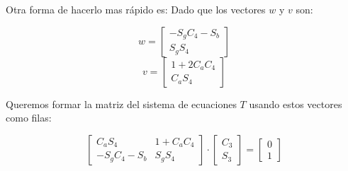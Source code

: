 \documentclass[a4paper,12pt]{article}
\begin{document}
Otra forma de hacerlo mas rápido es:
Dado que los vectores \( w \) y \( v \) son:

\[
w = \begin{bmatrix} -S_g C_4 - S_b \\ S_g S_4 \end{bmatrix}
\]
\[
v = \begin{bmatrix} 1 + 2C_a C_4 \\ C_a S_4 \end{bmatrix}
\]

Queremos formar la matriz del sistema de ecuaciones \( T \) usando estos vectores como filas:

\[
\begin{bmatrix} C_a S_4 & 1 + C_a C_4 \\ -S_g C_4 - S_b & S_g S_4 \end{bmatrix}
\cdot
\begin{bmatrix}C_3\\S_3\end{bmatrix}
=
\begin{bmatrix}0\\1\end{bmatrix}
\]
\end{document}

